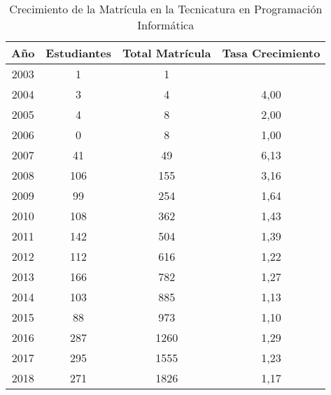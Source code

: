 \begin{table}[!htbp]
    \centering
    \begin{tabular}{|c|c|c|c|}
    \hline
    Año & Estudiantes & Total Matrícula & Tasa Crecimiento \\
    \hline
    2003 & 1 & 1 & \\
    \hline
    2004 & 3 & 4 & 4,00 \\
    \hline
    2005 & 4 & 8 & 2,00 \\
    \hline
    2006 & 0 & 8 & 1,00 \\
    \hline
    2007 & 41 & 49 & 6,13 \\
    \hline
    2008 & 106 & 155 & 3,16 \\
    \hline
    2009 & 99 & 254 & 1,64 \\
    \hline
    2010 & 108 & 362 & 1,43 \\
    \hline
    2011 & 142 & 504 & 1,39 \\ 
    \hline
    2012 & 112 & 616 & 1,22 \\
    \hline
    2013 & 166 & 782 & 1,27 \\
    \hline
    2014 & 103 & 885 & 1,13 \\
    \hline
    2015 & 88 & 973 & 1,10 \\
    \hline
    2016 & 287 & 1260 & 1,29 \\
    \hline
    2017 & 295 & 1555 & 1,23 \\
    \hline
    2018 & 271 & 1826 & 1,17 \\
    \hline
    \end{tabular}
    \caption{Crecimiento de la Matrícula en la Tecnicatura en Programación Informática}
    \label{tab:tabla_planes}
\end{table}

